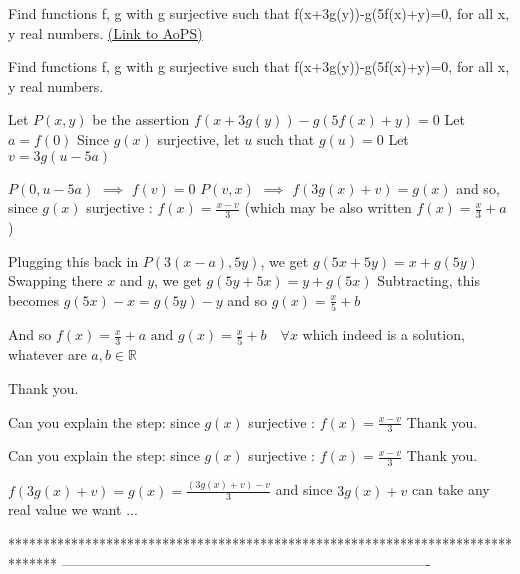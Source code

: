 \begin{problem}
	Find functions  f, g with g surjective such that f(x+3g(y))-g(5f(x)+y)=0, for all x, y real numbers.
	\flushright \href{https://artofproblemsolving.com/community/c6h1584184}{(Link to AoPS)}
\end{problem}



\begin{solution}
	\begin{tcolorbox}Find functions  f, g with g surjective such that f(x+3g(y))-g(5f(x)+y)=0, for all x, y real numbers.\end{tcolorbox}
Let $P(x,y)$ be the assertion $f(x+3g(y))-g(5f(x)+y)=0$
Let $a=f(0)$
Since $g(x)$ surjective, let $u$ such that $g(u)=0$
Let $v=3g(u-5a)$

$P(0,u-5a)$ $\implies$ $f(v)=0$
$P(v,x)$ $\implies$ $f(3g(x)+v)=g(x)$ and so, since $g(x)$ surjective :
$f(x)=\frac{x-v}3$ (which may be also written $f(x)=\frac x3+a$)

Plugging this back in $P(3(x-a),5y)$, we get $g(5x+5y)=x+g(5y)$
Swapping there $x$ and $y$, we get $g(5y+5x)=y+g(5x)$
Subtracting, this becomes $g(5x)-x=g(5y)-y$ and so $g(x)=\frac x5+b$

And so $\boxed{f(x)=\frac x3+a\text{  and  }g(x)=\frac x5+b\quad\forall x}$ which indeed is a solution, whatever are $a,b\in\mathbb R$
\end{solution}



\begin{solution}
	Thank you.
\end{solution}



\begin{solution}
	Can you explain the step: since $g(x)$ surjective :
$f(x)=\frac{x-v}3$ 
Thank you.
\end{solution}



\begin{solution}
	\begin{tcolorbox}Can you explain the step: since $g(x)$ surjective :
$f(x)=\frac{x-v}3$ 
Thank you.\end{tcolorbox}

$f(3g(x)+v)=g(x)=\frac{(3g(x)+v)-v}3$ and since $3g(x)+v$ can take any real value we want ...
\end{solution}
*******************************************************************************
-------------------------------------------------------------------------------

